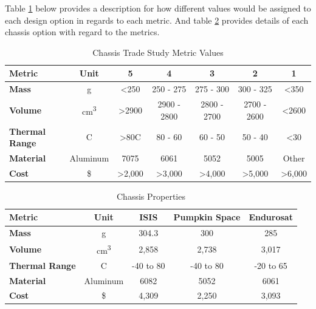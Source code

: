 Table \ref{tbl:chassis_Metric_Scores} below provides a description for how different values would be assigned to each design option in regards to each metric. And table \ref{tbl:chassis_Props} provides details of each chassis option with regard to the metrics.

\begin{table}[H]
\centering
\begin{tabular}{|l|c|c|c|c|c|c|} 
\hline
    \textbf{Metric} & \textbf{Unit} &  \textbf{5} & \textbf{4} & \textbf{3} & \textbf{2} & \textbf{1}
    \\
\hline
    \textbf{Mass} & g & <250 & 250 - 275 & 275 - 300 & 300 - 325 & <350
    \\
\hline
    \textbf{Volume} & cm\textsuperscript{3} & >2900 & 2900 - 2800 & 2800 - 2700 & 2700 - 2600 & <2600
    \\
\hline
    \textbf{Thermal Range} & C & >80C & 80 - 60 & 60 - 50 & 50 - 40 & <30
    \\
\hline
    \textbf{Material} & Aluminum & 7075 & 6061 & 5052 & 5005 & Other
    \\
\hline
    \textbf{Cost} & \$ & >2,000 & >3,000 & >4,000 & >5,000 & >6,000
    \\

\hline
\end{tabular}
\caption{Chassis Trade Study Metric Values}
\label{tbl:chassis_Metric_Scores}
\end{table}

\begin{table}[H]
\centering
\begin{tabular}{|l|c|c|c|c|} 
\hline
    \textbf{Metric} & \textbf{Unit} & \textbf{ISIS} & \textbf{Pumpkin Space} & \textbf{Endurosat}
    \\
\hline
    \textbf{Mass} & g & 304.3 & 300 & 285
    \\
\hline
    \textbf{Volume} & cm\textsuperscript{3} & 2,858 & 2,738 & 3,017
    \\
\hline
    \textbf{Thermal Range} & C & -40 to 80 & -40 to 80 & -20 to 65
    \\
\hline
    \textbf{Material} & Aluminum & 6082 & 5052 & 6061
    \\
\hline
    \textbf{Cost} & \$ & 4,309 & 2,250 & 3,093
    \\
\hline
\end{tabular}
\caption{Chassis Properties\cite{isis2}\cite{enduro_sat}\cite{pumpkin_space}}
\label{tbl:chassis_Props}
\end{table}

